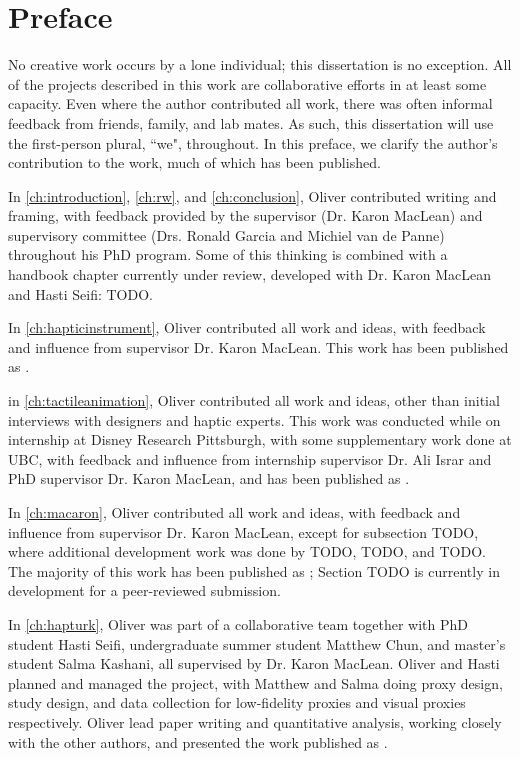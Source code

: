 
\chapter{Preface}
No creative work occurs by a lone individual; this dissertation is no exception.
All of the projects described in this work are collaborative efforts in at least some capacity.
Even where the author contributed all work, there was often informal feedback from friends, family, and lab mates.
As such, this dissertation will use the first-person plural, ``we", throughout.
In this preface, we clarify the author's contribution to the work, much of which has been published.

In \autoref{ch:introduction}, \autoref{ch:rw}, and \autoref{ch:conclusion}, Oliver contributed writing and framing, with feedback provided by the supervisor (Dr. Karon MacLean) and supervisory committee (Drs. Ronald Garcia and Michiel van de Panne) throughout his PhD program. 
Some of this thinking is combined with a handbook chapter currently under review, developed with Dr. Karon MacLean and Hasti Seifi: TODO.

In \autoref{ch:hapticinstrument}, Oliver contributed all work and ideas, with feedback and influence from supervisor Dr. Karon MacLean.
This work has been published as .

in \autoref{ch:tactileanimation}, Oliver contributed all work and ideas, other than initial interviews with designers and haptic experts. 
This work was conducted while on internship at Disney Research Pittsburgh, with some supplementary work done at UBC, with feedback and influence from internship supervisor Dr. Ali Israr and PhD supervisor Dr. Karon MacLean, and has been published as .

In \autoref{ch:macaron}, Oliver contributed all work and ideas, with feedback and influence from supervisor Dr. Karon MacLean, except for subsection TODO, where additional development work was done by TODO, TODO, and TODO.
The majority of this work has been published as ; Section TODO is currently in development for a peer-reviewed submission.

In \autoref{ch:hapturk}, Oliver was part of a collaborative team together with PhD student Hasti Seifi, undergraduate summer student Matthew Chun, and master's student Salma Kashani, all supervised by Dr. Karon MacLean.
Oliver and Hasti planned and managed the project, with Matthew and Salma doing proxy design, study design, and data collection for low-fidelity proxies and visual proxies respectively.
Oliver lead paper writing and quantitative analysis, working closely with the other authors, and presented the work published as .

